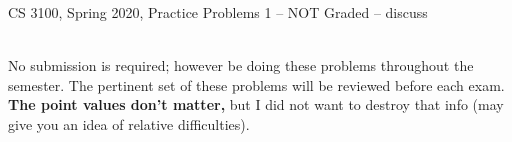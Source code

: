 \documentclass[12pt]{article}
\begin{document}



\begin{center}
\begin{large}
  CS 3100, Spring 2020, Practice Problems 1 -- NOT Graded -- discuss
  \ \\
  \ \\      
\end{large}


\end{center}
\date{}


\noindent No submission is required; however be doing these problems
throughout the semester. The pertinent set of these problems will be reviewed
before each exam. {\bf The point values don't matter,} but I did not want to
destroy that info (may give you an idea of relative difficulties).
\end{document}
